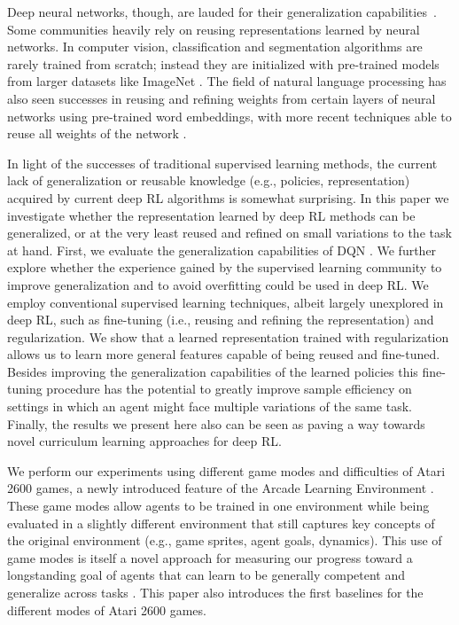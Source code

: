 \documentclass{article}
\begin{document}
Deep neural networks, though, are lauded for their generalization capabilities~\citep[e.g.,][]{Lecun98}. Some communities heavily rely on reusing representations learned by neural networks. 
In computer vision, classification and segmentation algorithms are rarely trained from scratch; instead they are initialized with pre-trained models from larger datasets like ImageNet \citep[e.g.,][]{Razavian14, Long15}. The field of natural language processing has also seen successes in reusing and refining weights from certain layers of neural networks using pre-trained word embeddings, with more recent techniques able to reuse all weights of the network \citep[e.g.,][]{Howard18}.


In light of the successes of traditional supervised learning methods, the current lack of generalization or reusable knowledge (e.g., policies, representation) acquired by current deep RL algorithms is somewhat surprising. In this paper we investigate whether the representation learned by deep RL methods can be generalized, or at the very least reused and refined on small variations to the task at hand. 
First, we evaluate the generalization capabilities of DQN \citep{Mnih15}.
We further explore whether the experience gained by the supervised learning community to improve generalization and to avoid overfitting could be used in deep RL.
We employ conventional supervised learning techniques, albeit largely unexplored in deep RL, such as fine-tuning (i.e., reusing and refining the representation) and regularization.
We show that a learned representation trained with regularization allows us to learn more general features capable of being reused and fine-tuned.
Besides improving the generalization capabilities of the learned policies this fine-tuning procedure has the potential to greatly improve sample efficiency on settings in which an agent might face multiple variations of the same task.
Finally, the results we present here also can be seen as paving a way towards novel curriculum learning approaches for deep RL.


We perform our experiments using different game modes and difficulties of Atari 2600 games, a newly introduced feature of the Arcade Learning Environment \citep[ALE;][]{Bellemare13}. These game modes allow agents to be trained in one environment while being evaluated in a slightly different environment that still captures key concepts of the original environment (e.g., game sprites, agent goals, dynamics).
This use of game modes is itself a novel approach for measuring our progress toward a longstanding goal of agents that can learn to be generally competent and generalize across tasks \citep{Bellemare13, Machado18, Nichol18}.
This paper also introduces the first baselines for the different modes of Atari 2600 games.
\end{document}
